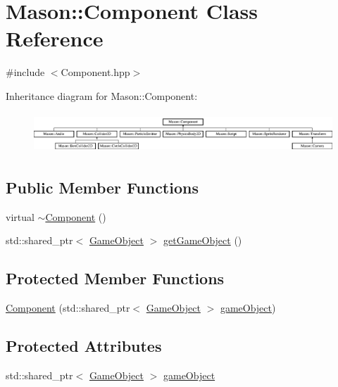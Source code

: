 \hypertarget{class_mason_1_1_component}{}\section{Mason\+:\+:Component Class Reference}
\label{class_mason_1_1_component}


{\ttfamily \#include $<$Component.\+hpp$>$}

Inheritance diagram for Mason\+:\+:Component\+:\begin{figure}[H]
\begin{center}
\leavevmode
\includegraphics[height=1.518987cm]{class_mason_1_1_component}
\end{center}
\end{figure}
\subsection*{Public Member Functions}
\begin{DoxyCompactItemize}
\item 
virtual \hyperlink{class_mason_1_1_component_ab8378fa275af98e568a7e91d33d867af}{$\sim$\+Component} ()
\item 
std\+::shared\+\_\+ptr$<$ \hyperlink{class_mason_1_1_game_object}{Game\+Object} $>$ \hyperlink{class_mason_1_1_component_a6c96ba73e4added598bfa975e000a3ea}{get\+Game\+Object} ()
\end{DoxyCompactItemize}
\subsection*{Protected Member Functions}
\begin{DoxyCompactItemize}
\item 
\hyperlink{class_mason_1_1_component_a19f394f7e3e940e7fc01d18d6a762d46}{Component} (std\+::shared\+\_\+ptr$<$ \hyperlink{class_mason_1_1_game_object}{Game\+Object} $>$ \hyperlink{class_mason_1_1_component_abaa67b569d0a70e26a4606f4a099a925}{game\+Object})
\end{DoxyCompactItemize}
\subsection*{Protected Attributes}
\begin{DoxyCompactItemize}
\item 
std\+::shared\+\_\+ptr$<$ \hyperlink{class_mason_1_1_game_object}{Game\+Object} $>$ \hyperlink{class_mason_1_1_component_abaa67b569d0a70e26a4606f4a099a925}{game\+Object}
\end{DoxyCompactItemize}
